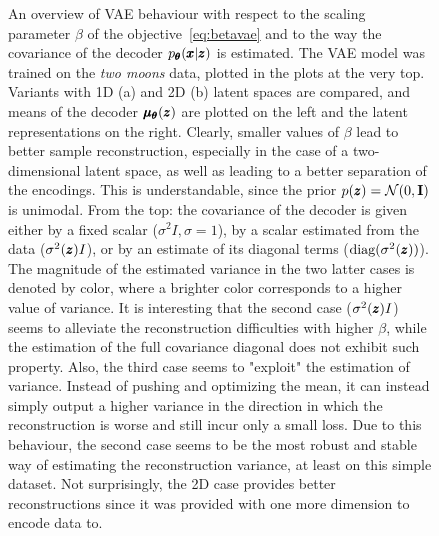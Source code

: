 \begin{figure}
\caption{An overview of VAE behaviour with respect to the scaling parameter $\beta$ of the objective~\eqref{eq:betavae} and to the way the covariance of the decoder $p_{\pmb{{\theta}}}(\pmb{{x}}|\pmb{{z}})$ is estimated. The VAE model was trained on the \textit{two moons} data, plotted in the plots at the very top. Variants with 1D (a) and 2D (b) latent spaces are compared, and means of the decoder $\pmb{{\mu}}_{\pmb{{\theta}}}(\pmb{{z}})$ are plotted on the left and the latent representations on the right. Clearly, smaller values of $\beta$ lead to better sample reconstruction, especially in the case of a two-dimensional latent space, as well as leading to a better separation of the encodings. This is understandable, since the prior $p(\pmb{{z}})=\mathcal{N}(0,\textbf{I})$ is unimodal. From the top: the covariance of the decoder is given either by a fixed scalar ($\sigma^2 I,\sigma=1$), by a scalar estimated from the data ($\sigma^2(\pmb{{z}})I$), or by an estimate of its diagonal terms ($\text{diag}(\sigma^2(\pmb{{z}}))$). The magnitude of the estimated variance in the two latter cases is denoted by color, where a brighter color corresponds to a higher value of variance. It is interesting that the second case ($\sigma^2(\pmb{{z}})I$) seems to alleviate the reconstruction difficulties with higher $\beta$, while the estimation of the full covariance diagonal does not exhibit such property. Also, the third case seems to "exploit" the estimation of variance. Instead of pushing and optimizing the mean, it can instead simply output a higher variance in the direction in which the reconstruction is worse and still incur only a small loss. Due to this behaviour, the second case seems to be the most robust and stable way of estimating the reconstruction variance, at least on this simple dataset. Not surprisingly, the 2D case provides better reconstructions since it was provided with one more dimension to encode data to.}
\label{fig:betavae}
\end{figure}

